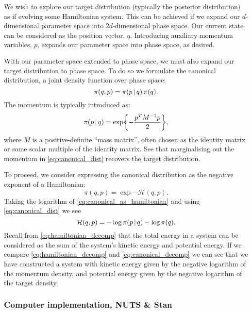 We wish to explore our target distribution (typically the posterior distribution) as if
evolving some Hamiltonian system. This can be achieved if we expand our $d$-dimensional
parameter space into $2d$-dimensional phase space. Our current state can be considered as
the position vector, $q$. Introducing auxiliary momentum variables, $p$, expands
our parameter space into phase space, as desired.

With our parameter space extended to phase space, we must also expand our target
distribution to phase space. To do so we formulate the canonical distribution, a joint
density function over phase space:
\begin{equation}
    \label{eq:canonical_dist}
    \pi(q, p) = \pi(p \,|\, q) \, \pi(q).
\end{equation}
The momentum is typically introduced as:
\begin{equation}
    \pi(p \,|\, q) = \exp{-\frac{p^T M^{-1} p}{2}},
\end{equation}
where $M$ is a positive-definite ``mass matrix'', often chosen as the identity matrix or
some scalar multiple of the identity matrix. See that marginalising out the momentum in
\cref{eq:canonical_dist} recovers the target distribution.

To proceed, we consider expressing the canonical distribution as the
negative exponent of a Hamiltonian:
\begin{equation}
    \label{eq:canonical_as_hamiltonian}
    \pi(q, p) = \exp{-\mathcal{H}(q,p)}.
\end{equation}
Taking the logarithm of \cref{eq:canonical_as_hamiltonian} and using \cref{eq:canonical_dist}
we see
\begin{equation}
    \label{eq:canonical_decomp}
    \mathcal{H}(q, p) = -\log{\pi(p \,|\,q)} - \log{\pi(q)}.
\end{equation}
Recall from \cref{eq:hamiltonian_decomp} that the total energy in a system can be
considered as the sum of the system's kinetic energy and potential energy.  If we compare
\cref{eq:hamiltonian_decomp} and \cref{eq:canonical_decomp} we can see that we have
constructed a system with kinetic energy given by the negative logarithm of the momentum
density, and potential energy given by the negative logarithm of the target density.

\subsubsection{Computer implementation, NUTS \& Stan}

